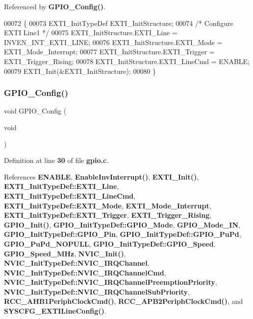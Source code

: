 Referenced by \textbf{ G\+P\+I\+O\+\_\+\+Config()}.


\begin{DoxyCode}
00072 \{
00073   EXTI_InitTypeDef   EXTI\_InitStructure;
00074   \textcolor{comment}{/* Configure EXTI Line1 */}
00075   EXTI\_InitStructure.EXTI_Line = INVEN_INT_EXTI_LINE;
00076   EXTI\_InitStructure.EXTI_Mode = EXTI_Mode_Interrupt;
00077   EXTI\_InitStructure.EXTI_Trigger = EXTI_Trigger_Rising;
00078   EXTI\_InitStructure.EXTI_LineCmd = ENABLE;
00079   EXTI_Init(&EXTI\_InitStructure);
00080 \}
\end{DoxyCode}
\mbox{\label{gpio_8c_a56c8ff165146f2f845a0bf90e3eacd39}} 
\subsubsection{G\+P\+I\+O\+\_\+\+Config()}
{\footnotesize\ttfamily void G\+P\+I\+O\+\_\+\+Config (\begin{DoxyParamCaption}\item[{void}]{ }\end{DoxyParamCaption})}



Definition at line \textbf{ 30} of file \textbf{ gpio.\+c}.



References \textbf{ E\+N\+A\+B\+LE}, \textbf{ Enable\+Inv\+Interrupt()}, \textbf{ E\+X\+T\+I\+\_\+\+Init()}, \textbf{ E\+X\+T\+I\+\_\+\+Init\+Type\+Def\+::\+E\+X\+T\+I\+\_\+\+Line}, \textbf{ E\+X\+T\+I\+\_\+\+Init\+Type\+Def\+::\+E\+X\+T\+I\+\_\+\+Line\+Cmd}, \textbf{ E\+X\+T\+I\+\_\+\+Init\+Type\+Def\+::\+E\+X\+T\+I\+\_\+\+Mode}, \textbf{ E\+X\+T\+I\+\_\+\+Mode\+\_\+\+Interrupt}, \textbf{ E\+X\+T\+I\+\_\+\+Init\+Type\+Def\+::\+E\+X\+T\+I\+\_\+\+Trigger}, \textbf{ E\+X\+T\+I\+\_\+\+Trigger\+\_\+\+Rising}, \textbf{ G\+P\+I\+O\+\_\+\+Init()}, \textbf{ G\+P\+I\+O\+\_\+\+Init\+Type\+Def\+::\+G\+P\+I\+O\+\_\+\+Mode}, \textbf{ G\+P\+I\+O\+\_\+\+Mode\+\_\+\+IN}, \textbf{ G\+P\+I\+O\+\_\+\+Init\+Type\+Def\+::\+G\+P\+I\+O\+\_\+\+Pin}, \textbf{ G\+P\+I\+O\+\_\+\+Init\+Type\+Def\+::\+G\+P\+I\+O\+\_\+\+Pu\+Pd}, \textbf{ G\+P\+I\+O\+\_\+\+Pu\+Pd\+\_\+\+N\+O\+P\+U\+LL}, \textbf{ G\+P\+I\+O\+\_\+\+Init\+Type\+Def\+::\+G\+P\+I\+O\+\_\+\+Speed}, \textbf{ G\+P\+I\+O\+\_\+\+Speed\+\_\+M\+Hz}, \textbf{ N\+V\+I\+C\+\_\+\+Init()}, \textbf{ N\+V\+I\+C\+\_\+\+Init\+Type\+Def\+::\+N\+V\+I\+C\+\_\+\+I\+R\+Q\+Channel}, \textbf{ N\+V\+I\+C\+\_\+\+Init\+Type\+Def\+::\+N\+V\+I\+C\+\_\+\+I\+R\+Q\+Channel\+Cmd}, \textbf{ N\+V\+I\+C\+\_\+\+Init\+Type\+Def\+::\+N\+V\+I\+C\+\_\+\+I\+R\+Q\+Channel\+Preemption\+Priority}, \textbf{ N\+V\+I\+C\+\_\+\+Init\+Type\+Def\+::\+N\+V\+I\+C\+\_\+\+I\+R\+Q\+Channel\+Sub\+Priority}, \textbf{ R\+C\+C\+\_\+\+A\+H\+B1\+Periph\+Clock\+Cmd()}, \textbf{ R\+C\+C\+\_\+\+A\+P\+B2\+Periph\+Clock\+Cmd()}, and \textbf{ S\+Y\+S\+C\+F\+G\+\_\+\+E\+X\+T\+I\+Line\+Config()}.



